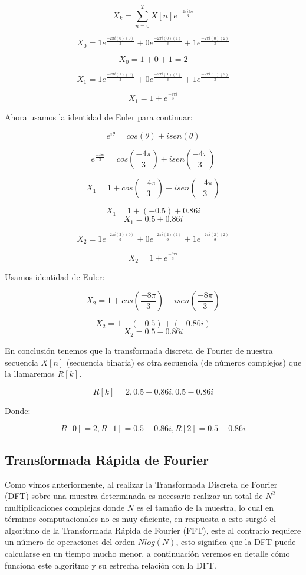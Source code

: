 \documentclass[a4paper]{article}
\begin{document}
$$ X_k = \sum_{n=0}^{2} X[n] e^{- \frac{2 \pi i k n}{3} } $$

$$ X_0 = 1 e^{\frac{-2 \pi i (0)(0) }{3} } + 0e^{\frac{-2 \pi i (0)(1) }{3} } + 1e^{\frac{-2 \pi i (0)(2) }{3} } $$

$$ X_0 = 1 + 0 + 1 = 2 $$


$$ X_1 = 1 e^{\frac{-2 \pi i (1)(0) }{3} } + 0e^{\frac{-2 \pi i (1)(1) }{3} } + 1e^{\frac{-2 \pi i (1)(2) }{3} } $$

$$ X_1 = 1 + e^{\frac {-4 \pi i} {3}}  $$

Ahora usamos la identidad de Euler para continuar:

$$ e^{i \theta } = cos (\theta) + i sen (\theta)$$

$$ e^{\frac {-4 \pi i} {3}} = cos ({\frac {-4 \pi } {3}}) + i sen ({\frac {-4 \pi } {3}})$$

$$ X_1 = 1 + cos ({\frac {-4 \pi } {3}}) + i sen ({\frac {-4 \pi } {3}})$$

$$ X_1 = 1 + (-0.5) + 0.86i $$
$$ X_1 = 0.5 + 0.86i $$

$$ X_2 = 1 e^{\frac{-2 \pi i (2)(0) }{3} } + 0e^{\frac{-2 \pi i (2)(1) }{3} } + 1e^{\frac{-2 \pi i (2)(2) }{3} } $$

$$ X_2 = 1 + e^{ \frac {-8 \pi i}{3}}$$

Usamos identidad de Euler:

$$ X_2 = 1 + cos( \frac{-8 \pi} {3}) + i sen ( \frac { -8 \pi}{3} ) $$

$$ X_2 = 1 + (-0.5) + (-0.86i) $$
$$ X_2 = 0.5 - 0.86i $$

En conclusión tenemos que la transformada discreta de Fourier de nuestra secuencia $X[n]$ (secuencia binaria) es otra secuencia (de números complejos) que la llamaremos $R[k]$.

$$R[k] = {2,   0.5 + 0.86i,   0.5 - 0.86i} $$

Donde:

$$R[0] = 2, R[1]= 0.5 + 0.86i, R[2] = 0.5 - 0.86i$$

\subsection{Transformada Rápida de Fourier}

Como vimos anteriormente, al realizar la Transformada Discreta de Fourier (DFT) sobre una muestra determinada es necesario realizar un total de $N^2$ multiplicaciones complejas donde $N$ es el tamaño de la muestra, lo cual en términos computacionales no es muy eficiente, en respuesta a esto surgió el algoritmo de la Transformada Rápida de Fourier (FFT), este al contrario requiere un número de operaciones del orden $Nlog(N)$, esto significa que la DFT puede calcularse en un tiempo mucho menor, a continuación veremos en detalle cómo funciona este algoritmo y su estrecha relación con la DFT.\\
\end{document}
